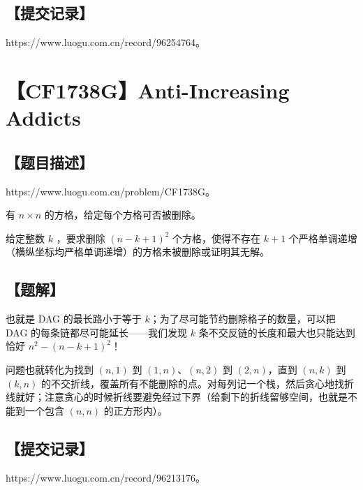 \documentclass[UTF8,12pt,a4paper]{ctexart}
\begin{document}
	\subsection*{【提交记录】}
	
	https://www.luogu.com.cn/record/96254764。
	
	
	\section*{【CF1738G】Anti-Increasing Addicts}
	
	\subsection*{【题目描述】}
	
	https://www.luogu.com.cn/problem/CF1738G。
	
	有 $n\times n$ 的方格，给定每个方格可否被删除。
	
	给定整数 $k$ ，要求删除 $(n-k+1)^2$ 个方格，使得不存在 $k+1$ 个严格单调递增（横纵坐标均严格单调递增）的方格未被删除或证明其无解。
	
	\subsection*{【题解】}
	
	也就是 DAG 的最长路小于等于 $k$；为了尽可能节约删除格子的数量，可以把 DAG 的每条链都尽可能延长——我们发现 $k$ 条不交反链的长度和最大也只能达到恰好 $n^2-(n-k+1)^2$！
	
	问题也就转化为找到 $(n,1)$ 到 $(1,n)$、$(n,2)$ 到 $(2,n)$，直到 $(n,k)$ 到 $(k,n)$ 的不交折线，覆盖所有不能删除的点。对每列记一个栈，然后贪心地找折线就好；注意贪心的时候折线要避免经过下界（给剩下的折线留够空间，也就是不能到一个包含 $(n,n)$ 的正方形内）。
	
	\subsection*{【提交记录】}
	
	https://www.luogu.com.cn/record/96213176。
	
	
\end{document}
